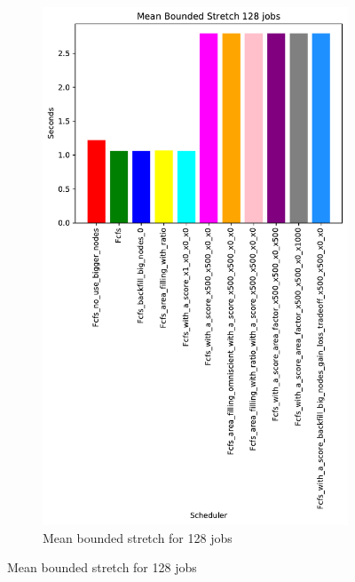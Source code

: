 \documentclass[a4paper]{article}
\begin{document}
\begin{figure}[H]
\begin{subfigure}[b]{0.4\linewidth}\centering\includegraphics[width=0.7\linewidth]{MBSS/plot/Results_Size_And_Data_2022-03-01->2022-03-03_V9532_Mean_Stretch_With_a_Minimum_128_450_128_32_256_4_1024.pdf}\caption{Mean bounded stretch for 128 jobs}\label{45}\end{subfigure}

\end{figure}
\end{document}

